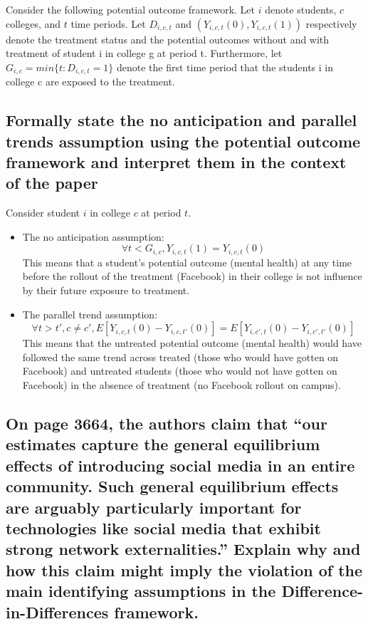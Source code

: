 \documentclass{article}
\begin{document}
Consider the following potential outcome framework. Let \(i\) denote students, \(c\) colleges, and \(t\) time periods. Let
\(D_{i,c,t}\) and \((Y_{i,c,t}(0),Y_{i,c,t}(1))\)
respectively denote the treatment status and the potential outcomes without and with treatment of student i in college g at period t. Furthermore, let
\(G_{i,c}=min\{t:D_{i,c,t}=1\}\)
denote the first time period that the students i in college c are exposed to the treatment.

\subsection{Formally state the no anticipation and parallel trends assumption using the potential outcome framework and interpret them in the context of the paper}

Consider student \(i\) in college \(c\) at period \(t\).
\begin{itemize}
    \item The no anticipation assumption:
    \[\forall t < G_{i,c}, Y_{i,c,t}(1)=Y_{i,c,t}(0)\]
    This means that a student's potential outcome (mental health) at any time before the rollout of the treatment (Facebook) in their college is not influence by their future exposure to treatment.
    \item The parallel trend assumption:
    \[\forall t>t', c\neq c',
    E[Y_{i,c,t}(0)-Y_{i,c,t'}(0)]
    =E[Y_{i,c',t}(0)-Y_{i,c',t'}(0)]
    \]
    This means that the untreated potential outcome (mental health) would have followed the same trend across treated (those who would have gotten on Facebook) and untreated students (those who would not have gotten on Facebook) in the absence of treatment (no Facebook rollout on campus).
\end{itemize}

\subsection{On page 3664, the authors claim that “our estimates capture the general equilibrium effects of introducing social media in an entire community. Such general equilibrium effects are arguably particularly important for technologies like social media that exhibit strong network externalities.”  Explain why and how this claim might imply the violation of the main identifying assumptions in the Difference-in-Differences framework.}
\end{document}
